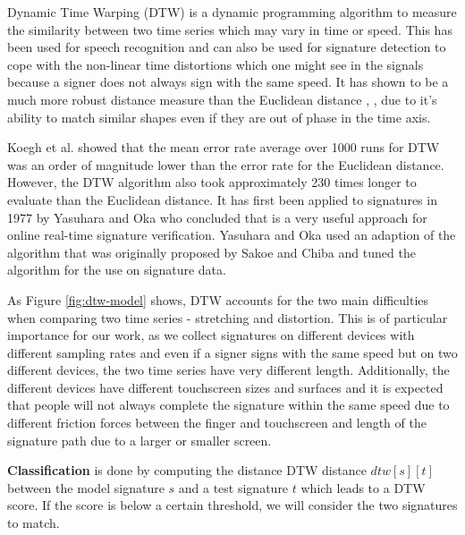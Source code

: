 \documentclass[a4paper, oneside]{csthesis}
\begin{document}
Dynamic Time Warping (DTW) is a dynamic programming algorithm to measure the similarity between two time series which may vary in time or speed. This has been used for speech recognition and can also be used for signature detection to cope with the non-linear time distortions which one might see in the signals because a signer does not always sign with the same speed. It has shown to be a much more robust distance measure than the Euclidean distance \cite{Keogh:2000:SUD:347090.347153}, \cite{1030918}, \cite{1227706} due to it's ability to match similar shapes even if they are out of phase in the time axis.

Koegh et al. \cite{Keogh:2002:EID:1287369.1287405} showed that the mean error rate average over 1000 runs for DTW was an order of magnitude lower than the error rate for the Euclidean distance. However, the DTW algorithm also took approximately 230 times longer to evaluate than the Euclidean distance.
It has first been applied to signatures in 1977 by Yasuhara and Oka \cite{yasuhara1977DTW} who concluded that is a very useful approach for online real-time signature verification. Yasuhara and Oka used an adaption of the algorithm that was originally proposed by Sakoe and Chiba \cite{1163055} and tuned the algorithm for the use on signature data.

As Figure \ref{fig:dtw-model} shows, DTW accounts for the two main difficulties when comparing two time series - stretching and distortion. This is of particular importance for our work, as we collect signatures on different devices with different sampling rates and even if a signer signs with the same speed but on two different devices, the two time series have very different length. Additionally, the different devices have different touchscreen sizes and surfaces and it is expected that people will not always complete the signature within the same speed due to different friction forces between the finger and touchscreen and length of the signature path due to a larger or smaller screen.



\textbf{Classification} is done by computing the distance DTW distance $dtw[s][t]$ between the model signature $s$ and a test signature $t$ which leads to a DTW score. If the score is below a certain threshold, we will consider the two signatures to match.
\end{document}
